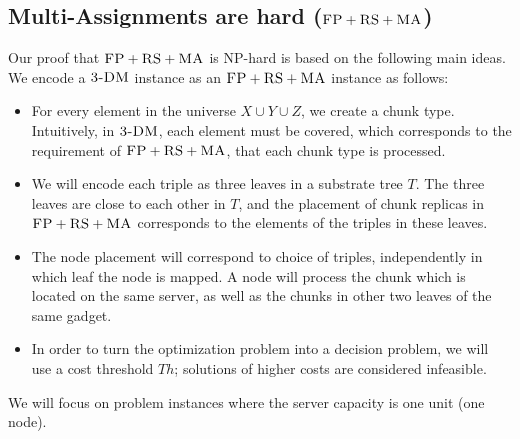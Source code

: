 \documentclass[9pt]{sigcomm-alternate}
\newcommand{\FP}{\textsc{FP}}
\newcommand{\RS}{\textsc{RS}}
\newcommand{\MA}{\textsc{MA}}
\newcommand{\Tree}{\ensuremath{T}}
\newcommand{\TDM}{\textsc{3-DM}}
\newcommand{\Thr}{\ensuremath{Th}}
\begin{document}

\subsection{Multi-Assignments are hard ($\FP+\RS+\MA$)}\label{ssec:fprsma}

Our proof that $\FP+\RS+\MA$ is NP-hard is based on the following main ideas.
We encode a $\TDM$ instance as an $\FP+\RS+\MA$ instance as follows:

 \begin{itemize}
 \item For every element in the universe $X\cup Y\cup
 Z$, we create a chunk type. Intuitively, in $\TDM$,
 each element must be covered, which corresponds to the requirement
 of $\FP+\RS+\MA$,
 that each chunk type is processed.

 \item We will encode each triple as three leaves in
 a substrate tree $\Tree$. The three leaves are close to each
 other in $\Tree$, and the placement of chunk replicas in $\FP+\RS+\MA$
 corresponds to the elements of the
 triples in these leaves.

 \item The node placement will correspond to choice of triples,
 independently in which leaf the node is mapped.
 A node will process the chunk which is located on the same server,
 as well as the chunks in other two leaves of the same gadget.

\item In order to turn the optimization problem into a decision problem, we will use 
a cost threshold $\Thr$; solutions of higher costs are considered infeasible. 
\end{itemize}

We will focus on problem instances where the server capacity is one unit (one node).
\end{document}
